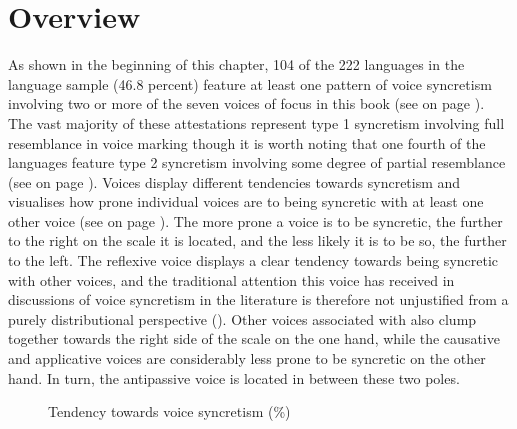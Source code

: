 \section{Overview} \label{dist:overview}
As shown in the beginning of this chapter, 104 of the 222 languages in the language sample (46.8 percent) feature at least one pattern of voice syncretism involving two or more of the seven voices of focus in this book (see  on page \pageref{tab:ch6:voice-syncretism}). The vast majority of these attestations represent type 1 syncretism involving full resemblance in voice marking though it is worth noting that one fourth of the languages feature type 2 syncretism involving some degree of partial resemblance (see  on page \pageref{tab:ch6:voice-syncretism-type-2}). Voices display different tendencies towards syncretism and  visualises how prone individual voices are to being syncretic with at least one other voice (see  on page \pageref{tab:ch6:voice-syncretism-macroarea-2}). The more prone a voice is to be syncretic, the further to the right on the scale it is located, and the less likely it is to be so, the further to the left. The reflexive voice displays a clear tendency towards being syncretic with other voices, and the traditional attention this voice has received in discussions of voice syncretism in the literature is therefore not unjustified from a purely distributional perspective (). Other voices associated with  also clump together towards the right side of the scale on the one hand, while the causative and applicative voices are considerably less prone to be syncretic on the other hand. In turn, the antipassive voice is located in between these two poles.

\begin{figure}
	\caption{Tendency towards voice syncretism (\%)}
	\label{ch6:fig:scale-syncretism}
\end{figure}



